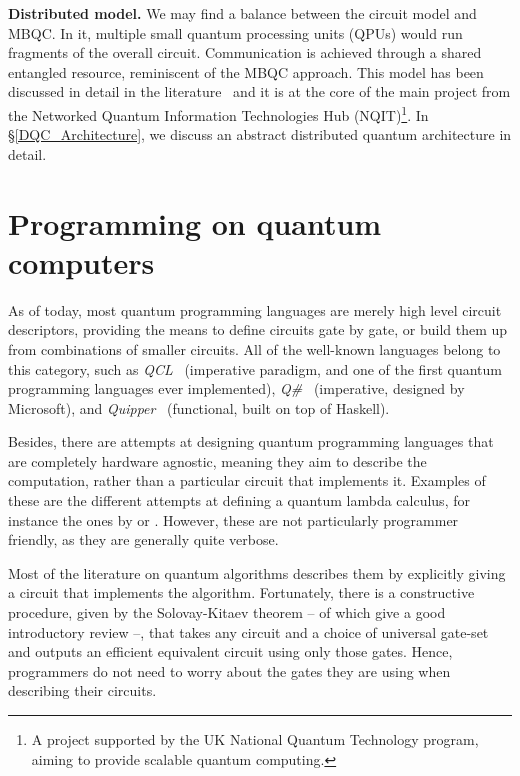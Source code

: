 \textbf{Distributed model.} We may find a balance between the circuit model and MBQC. In it, multiple small quantum processing units (QPUs) would run fragments of the overall circuit. Communication is achieved through a shared entangled resource, reminiscent of the MBQC approach. This model has been discussed in detail in the literature~\citep{DistributedQCHW} and it is at the core of the main project from the Networked Quantum Information Technologies Hub (NQIT)\footnote{A project supported by the UK National Quantum Technology program, aiming to provide scalable quantum computing.}. In \S\ref{DQC_Architecture}, we discuss an abstract distributed quantum architecture in detail.



\section{Programming on quantum computers}

As of today, most quantum programming languages are merely high level circuit descriptors, providing the means to define circuits gate by gate, or build them up from combinations of smaller circuits. All of the well-known languages belong to this category, such as \textit{QCL}~\citep{QCL} (imperative paradigm, and one of the first quantum programming languages ever implemented), \textit{Q\#}~\citep{QLang} (imperative, designed by Microsoft), and \textit{Quipper}~\citep{Quipper} (functional, built on top of Haskell). 

Besides, there are attempts at designing quantum programming languages that are completely hardware agnostic, meaning they aim to describe the computation, rather than a particular circuit that implements it. Examples of these are the different attempts at defining a quantum lambda calculus, for instance the ones by \citet{VanTonder} or \citet{Diaz-Caro}. However, these are not particularly programmer friendly, as they are generally quite verbose.

Most of the literature on quantum algorithms describes them by explicitly giving a circuit that implements the algorithm. Fortunately, there is a constructive procedure, given by the Solovay-Kitaev theorem -- of which \citet{SolovayKitaev} give a good introductory review --, that takes any circuit and a choice of universal gate-set and outputs an efficient equivalent circuit using only those gates. Hence, programmers do not need to worry about the gates they are using when describing their circuits.

